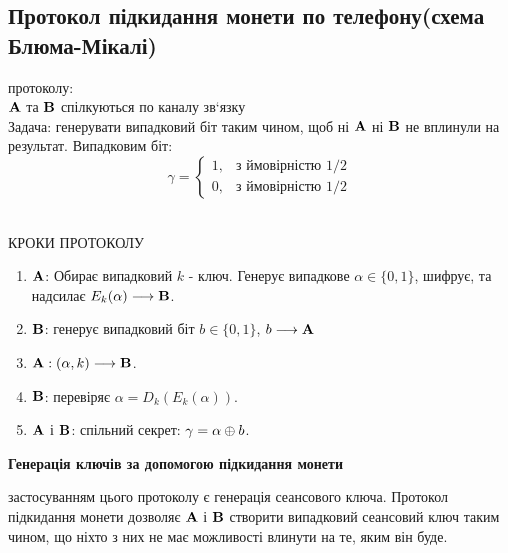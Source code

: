 \subsection{Протокол підкидання монети по телефону(схема Блюма-Мікалі)}
 протоколу:\\
$\bold{A}$ та $\bold{B}$ спілкуються по каналу зв`язку\\
Задача: генерувати випадковий біт таким чином, щоб ні $\bold{A}$ ні $\bold{B}$ не вплинули на результат. Випадковим біт:
\begin{equation*}
\gamma = 
	\begin{cases}
		1, &\text{з ймовірністю 1/2}\\
		0, &\text{з ймовірністю 1/2}
	\end{cases}
\end{equation*}\\


\begin{center}
КРОКИ ПРОТОКОЛУ
\end{center}
\begin{enumerate}
\item $\bold{A}$: Обирає випадковий $k$ - ключ. Генерує випадкове $\alpha \in \{0,1\}$, шифрує, та надсилає $E_k(\alpha)\longrightarrow \bold{B}$.
\item $\bold{B}$: генерує випадковий біт $b\in\{0,1\}$, $b\longrightarrow\bold{A}$

\item $\bold{A}: (\alpha, k)\longrightarrow\bold{B}$.
\item $\bold{B}$: перевіряє $\alpha = D_k(E_k(\alpha))$. 
\item $\bold{A}$ і $\bold{B}$: спільний секрет: $\gamma = \alpha\oplus b$.
\end{enumerate}
\begin{center}
\textbf{Генерація ключів за допомогою підкидання монети}
\end{center}
 застосуванням цього протоколу є генерація сеансового ключа. Протокол підкидання монети дозволяє $\bold{A}$ і $\bold{B}$ створити випадковий сеансовий ключ таким чином, що ніхто з них не має можливості влинути на те, яким він буде.

